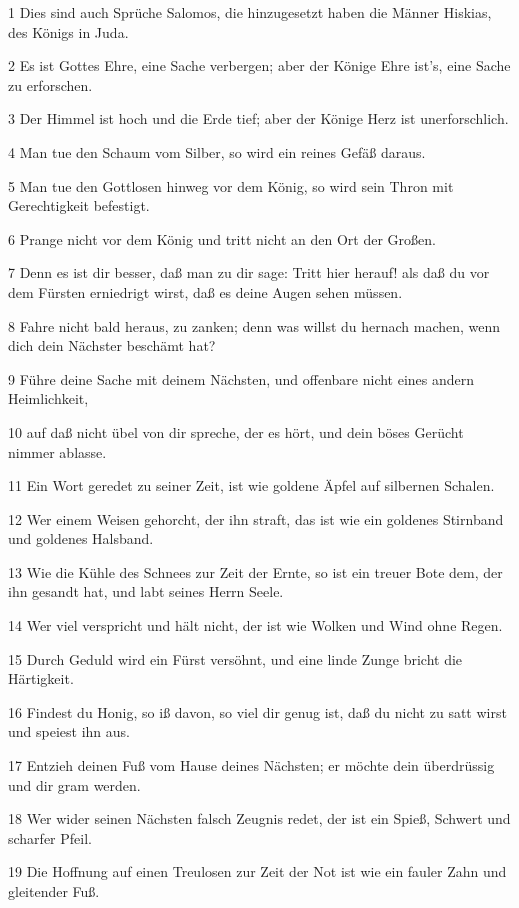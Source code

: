 \par 1 Dies sind auch Sprüche Salomos, die hinzugesetzt haben die Männer Hiskias, des Königs in Juda.
\par 2 Es ist Gottes Ehre, eine Sache verbergen; aber der Könige Ehre ist's, eine Sache zu erforschen.
\par 3 Der Himmel ist hoch und die Erde tief; aber der Könige Herz ist unerforschlich.
\par 4 Man tue den Schaum vom Silber, so wird ein reines Gefäß daraus.
\par 5 Man tue den Gottlosen hinweg vor dem König, so wird sein Thron mit Gerechtigkeit befestigt.
\par 6 Prange nicht vor dem König und tritt nicht an den Ort der Großen.
\par 7 Denn es ist dir besser, daß man zu dir sage: Tritt hier herauf! als daß du vor dem Fürsten erniedrigt wirst, daß es deine Augen sehen müssen.
\par 8 Fahre nicht bald heraus, zu zanken; denn was willst du hernach machen, wenn dich dein Nächster beschämt hat?
\par 9 Führe deine Sache mit deinem Nächsten, und offenbare nicht eines andern Heimlichkeit,
\par 10 auf daß nicht übel von dir spreche, der es hört, und dein böses Gerücht nimmer ablasse.
\par 11 Ein Wort geredet zu seiner Zeit, ist wie goldene Äpfel auf silbernen Schalen.
\par 12 Wer einem Weisen gehorcht, der ihn straft, das ist wie ein goldenes Stirnband und goldenes Halsband.
\par 13 Wie die Kühle des Schnees zur Zeit der Ernte, so ist ein treuer Bote dem, der ihn gesandt hat, und labt seines Herrn Seele.
\par 14 Wer viel verspricht und hält nicht, der ist wie Wolken und Wind ohne Regen.
\par 15 Durch Geduld wird ein Fürst versöhnt, und eine linde Zunge bricht die Härtigkeit.
\par 16 Findest du Honig, so iß davon, so viel dir genug ist, daß du nicht zu satt wirst und speiest ihn aus.
\par 17 Entzieh deinen Fuß vom Hause deines Nächsten; er möchte dein überdrüssig und dir gram werden.
\par 18 Wer wider seinen Nächsten falsch Zeugnis redet, der ist ein Spieß, Schwert und scharfer Pfeil.
\par 19 Die Hoffnung auf einen Treulosen zur Zeit der Not ist wie ein fauler Zahn und gleitender Fuß.
